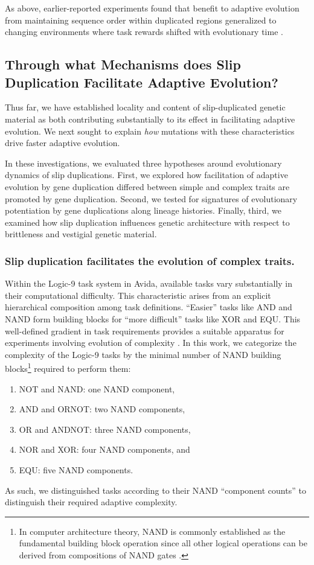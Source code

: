 As above, earlier-reported experiments found that benefit to adaptive evolution from maintaining sequence order within duplicated regions generalized to changing environments where task rewards shifted with evolutionary time \citep{lalejini2017gene}.

\subsection{Through what Mechanisms does Slip Duplication Facilitate Adaptive Evolution?}

Thus far, we have established locality and content of slip-duplicated genetic material as both contributing substantially to its effect in facilitating adaptive evolution.
We next sought to explain \textit{how} mutations with these characteristics drive faster adaptive evolution.

In these investigations, we evaluated three hypotheses around evolutionary dynamics of slip duplications.
First, we explored how facilitation of adaptive evolution by gene duplication differed between simple and complex traits are promoted by gene duplication.
Second, we tested for signatures of evolutionary potentiation by gene duplications along lineage histories.
Finally, third, we examined how slip duplication influences genetic architecture with respect to brittleness and vestigial genetic material.

\subsubsection{Slip duplication facilitates the evolution of complex traits.}

Within the Logic-9 task system in Avida, available tasks vary substantially in their computational difficulty.
This characteristic arises from an explicit hierarchical composition among task definitions.
``Easier'' tasks like AND and NAND form building blocks for ``more difficult'' tasks like XOR and EQU.
This well-defined gradient in task requirements provides a suitable apparatus for experiments involving evolution of complexity \citep{lenski2003evolutionary}.
In this work, we categorize the complexity of the Logic-9 tasks by the minimal number of NAND building blocks\footnote{
In computer architecture theory, NAND is commonly established as the fundamental building block operation since all other logical operations can be derived from compositions of NAND gates \citep{mano1997logic}.
} required to perform them:
\begin{enumerate}
\item NOT and NAND: one NAND component,
\item AND and ORNOT: two NAND components,
\item OR and ANDNOT: three NAND components,
\item NOR and XOR: four NAND components, and
\item EQU: five NAND components.
\end{enumerate}
As such, we distinguished tasks according to their NAND ``component counts'' to distinguish their required adaptive complexity.

